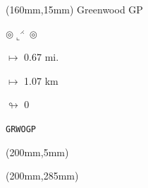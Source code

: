 \begin{textblock*}{40mm}(160mm,15mm)%
Greenwood GP
\par $\circledcirc\llcorner^{\rightthreetimes}\circledcirc$
\Large
\par$\mapsto$ 0.67 mi.
\par$\mapsto$ 1.07 km
\par$\looparrowright$ 0
\par\hfill\tiny\tt GRWOGP\\
\end{textblock*}
\begin{textblock*}{20mm}(200mm,5mm)%
\fbox{\thepage}
\end{textblock*}
\begin{textblock*}{20mm}(200mm,285mm)%
\fbox{\thepage}
\end{textblock*}
\null\newpage

